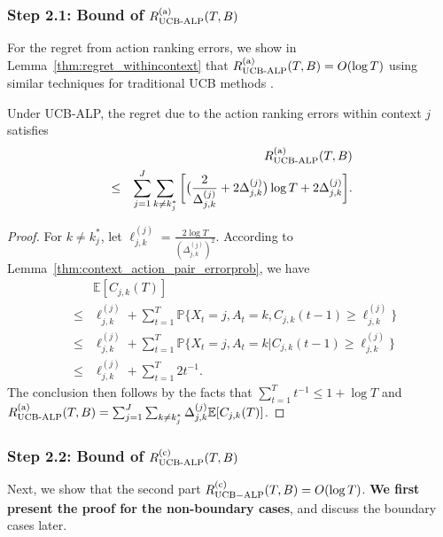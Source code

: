 \subsubsection{Step 2.1: Bound of $R_{\text{UCB-ALP}}^{\rm (a)}(T, B)$}
For the regret from action ranking errors,
we show in Lemma~\ref{thm:regret_withincontext} that $R_{\text{UCB-ALP}}^{\rm (a)}(T, B) = O(\log T)$ using similar techniques for traditional UCB methods \cite{Golovin2009Lecture}.
\begin{lemma}\label{thm:regret_withincontext}
Under UCB-ALP, the regret due to the action ranking errors within context $j$ satisfies
\begin{eqnarray} \label{eq:regret_ucb_alp_regret_withincontext}
&& R_{\text{UCB-ALP}}^{\rm (a)}(T, B) \nonumber\\
&\leq& \sum_{j=1}^J \sum_{k \neq k_j^*} \bigg[\big(\frac{2}{\Delta_{j,k}^{(j)}} + 2\Delta_{j,k}^{(j)}\big) \log T + 2 \Delta_{j,k}^{(j)}\bigg].
\end{eqnarray}
\end{lemma}
\begin{proof}
For $k \neq k_j^*$, let $\ell_{j,k}^{(j)} = \frac{2\log T}{(\Delta_{j, k}^{(j)})^2}$. According to Lemma~\ref{thm:context_action_pair_errorprob}, we have
\begin{eqnarray}
&& \mathbb{E}[C_{j,k}(T)] \nonumber \\
&\leq& \ell_{j,k}^{(j)} + \sum_{t = 1}^T \mathbb{P}\{X_t = j, A_t = k, C_{j,k}(t-1) \geq \ell_{j,k}^{(j)}\} \nonumber \\
&\leq & \ell_{j,k}^{(j)} + \sum_{t = 1}^T \mathbb{P}\{X_t = j, A_t = k | C_{j,k}(t-1) \geq \ell_{j,k}^{(j)}\} \nonumber \\
&\leq & \ell_{j,k}^{(j)} + \sum_{t = 1}^T  2t^{-1}. \nonumber
\end{eqnarray}
The conclusion then follows by the facts that $\sum_{t = 1}^T t^{-1} \leq 1 + \log T$ and $R_{\text{UCB-ALP}}^{\rm (a)}(T, B) =  \sum_{j = 1}^J\sum_{k \neq k_j^*} \Delta_{j,k}^{(j)} \mathbb{E}[C_{j,k}(T)]$.
\end{proof}

\subsubsection{Step 2.2: Bound of $R_{\text{UCB-ALP}}^{\rm (c)}(T, B)$}
Next, we show that the second part $R_{\rm {UCB-ALP}}^{({\rm c})}(T, B) = O(\log T)$.
\textbf{We first present the proof for the non-boundary cases}, and discuss the boundary cases later.

